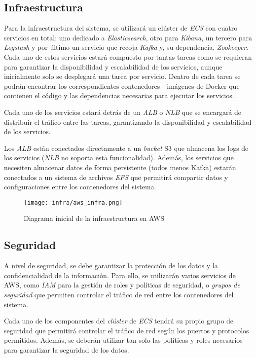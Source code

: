 \newpage{}
\subsection{Infraestructura}
Para la infraestructura del sistema, se utilizará un clúster de \textit{ECS} con
cuatro servicios en total: uno dedicado a \textit{Elasticsearch}, otro para
\textit{Kibana}, un tercero para \textit{Logstash} y por último un servicio que
recoja \textit{Kafka} y, su dependencia, \textit{Zookeeper}. Cada uno de estos
servicios estará compuesto por tantas tareas como se requieran para garantizar
la disponibilidad y escalabilidad de los servicios, aunque inicialmente solo se
desplegará una tarea por servicio. Dentro de cada tarea se podrán encontrar los
correspondientes contenedores - imágenes de Docker que contienen el código y las
dependencias necesarias para ejecutar los servicios.

Cada uno de los servicios estará detrás de un \textit{ALB} o \textit{NLB} que se
encargará de distribuir el tráfico entre las tareas, garantizando la
disponibilidad y escalabilidad de los servicios.

Los \textit{ALB} están conectados directamente a un \textit{bucket} S3 que
almacena los logs de los servicios (\textit{NLB} no soporta esta funcionalidad).
Además, los servicios que necesiten almacenar datos de forma persistente (todos
menos Kafka) estarán conectados a un sistema de archivos \textit{EFS} que
permitirá compartir datos y configuraciones entre los contenedores del sistema.

\begin{figure}[H]
	\centerline{\texttt{[image: infra/aws\_infra.png]}}
	\caption{Diagrama inicial de la infraestructura en AWS}

	\label{fig:aws_infra}
\end{figure}


\subsection{Seguridad}
A nivel de seguridad, se debe garantizar la protección de los datos y la
confidencialidad de la información. Para ello, se utilizarán varios servicios de
AWS, como \textit{IAM} para la gestión de roles y políticas de seguridad, o
\textit{grupos de seguridad} que permiten controlar el tráfico de red entre los
contenedores del sistema.

Cada uno de los componentes del \textit{clúster} de \textit{ECS} tendrá su
propio grupo de seguridad que permitirá controlar el tráfico de red según los
puertos y protocolos permitidos. Además, se deberán utilizar tan solo las
políticas y roles necesarios para garantizar la seguridad de los datos.

